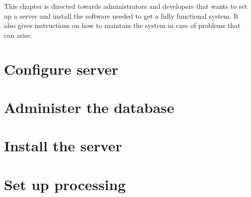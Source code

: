 
This chapter is directed towards administrators and developers that wants to set up a server and install the software needed to get a fully functional system. It also gives instructions on how to maintain the system in case of problems that can arise.

\section{Configure server}


\section{Administer the database}


\section{Install the server}


\section{Set up processing}


